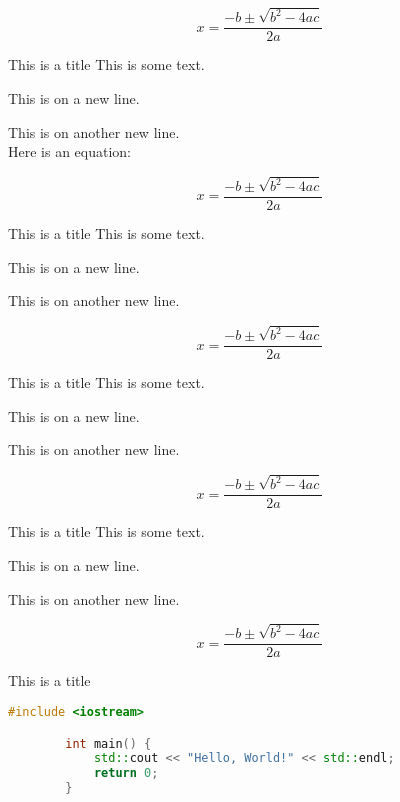 

\lipsum[10]

\begin{equation*}
    x = \frac{-b \pm \sqrt{b^2 - 4ac}}{2a}
\end{equation*}

\begin{greybox}{This is a title}
    This is some text.

    This is on a new line.

    This is on another new line.\\
    Here is an equation:

    \begin{equation*}
        x = \frac{-b \pm \sqrt{b^2 - 4ac}}{2a}
    \end{equation*}
\end{greybox}

\begin{redbox}{This is a title}
    This is some text.

    This is on a new line.

    This is on another new line.

    \begin{equation*}
        x = \frac{-b \pm \sqrt{b^2 - 4ac}}{2a}
    \end{equation*}
\end{redbox}

\begin{bluebox}{This is a title}
    This is some text.

    This is on a new line.

    This is on another new line.

    \begin{equation*}
        x = \frac{-b \pm \sqrt{b^2 - 4ac}}{2a}
    \end{equation*}
\end{bluebox}

\begin{greenbox}{This is a title}
    This is some text.

    This is on a new line.

    This is on another new line.

    \begin{equation*}
        x = \frac{-b \pm \sqrt{b^2 - 4ac}}{2a}
    \end{equation*}
\end{greenbox}

\begin{codebox}{This is a title}
    \begin{lstlisting}[language=C++]
        #include <iostream>

        int main() {
            std::cout << "Hello, World!" << std::endl;
            return 0;
        }
    \end{lstlisting}
\end{codebox}

